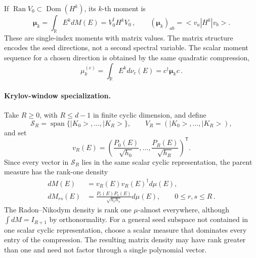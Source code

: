 \documentclass[a4paper,11pt]{article}
\def\ket#1{|#1>}%
\def\bra#1{<#1|}%
\def\dd{d}%
\theoremstyle{definition}
\theoremstyle{remark}
\newcommand{\ket}[1]{|#1\rangle}
\newcommand{\bra}[1]{\langle #1|}
\newcommand{\dd}{\mathrm d}
\newcommand{\RR}{\mathbb R}
\newcommand{\Span}{\operatorname{span}}
\newcommand{\Dom}{\operatorname{Dom}}
\begin{document}
If $\operatorname{Ran}V_0\subset\Dom(H^k)$, its $k$-th moment is
\begin{equation}
   \boldsymbol{\mu}_k
   =\int_{\RR}E^k\dd M(E)
   =V_0^\dagger H^kV_0\,,
   \qquad
   (\boldsymbol{\mu}_k)_{ab}=\bra{v_a}H^k\ket{v_b}.
   \label{eq:matrix-moments-main}
\end{equation}
These are single-index moments with matrix values.  The matrix structure encodes the seed
directions, not a second spectral variable.  The scalar moment sequence for a chosen
direction is obtained by the same quadratic compression,
\begin{equation}
   \mu_k^{(c)}
   =\int_{\RR}E^k\dd\nu_c(E)
   =c^\dagger\boldsymbol{\mu}_k c\,.
\end{equation}

\paragraph{Krylov-window specialization.}
Take $R\ge0$, with $R\le d-1$ in finite cyclic dimension, and define
\begin{equation}
   \mathcal S_R
   =\Span\{\ket{K_0},\ldots,\ket{K_R}\},
   \qquad
   V_R=(\ket{K_0},\ldots,\ket{K_R}),
\end{equation}
and set
\begin{equation}
   v_R(E)
   =\left(
      \frac{P_0(E)}{\sqrt{h_0}},\ldots,
      \frac{P_R(E)}{\sqrt{h_R}}
   \right)^{\mathsf T}.
\end{equation}
Since every vector in $\mathcal S_R$ lies in the same scalar cyclic
representation, the parent measure has the rank-one density
\begin{equation}
\begin{aligned}
   \dd M(E)&=v_R(E)v_R(E)^\dagger\dd\mu(E),\\
   \dd M_{rs}(E)
   &=\frac{P_r(E)P_s(E)}{\sqrt{h_rh_s}}\dd\mu(E),
   \qquad 0\le r,s\le R\,.
\end{aligned}
   \label{eq:krylov-block-measure}
\end{equation}
The Radon--Nikodym density is rank one $\mu$-almost everywhere, although
$\int\dd M=I_{R+1}$ by orthonormality.  For a general seed
subspace not contained in one scalar cyclic representation, choose a
scalar measure that dominates every entry of the compression. The
resulting matrix density may have rank greater than one and need not
factor through a single polynomial vector.
\end{document}
